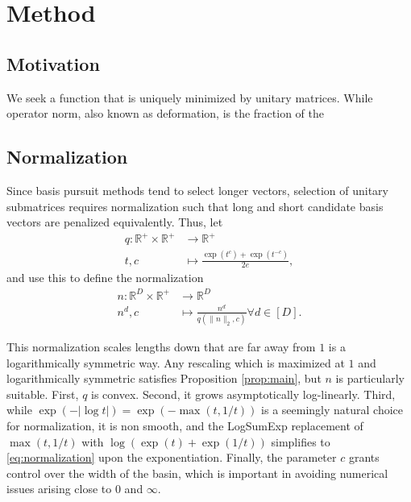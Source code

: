 \section{Method}


\subsection{Motivation}

We seek a function that is uniquely minimized by unitary matrices.
While operator norm, also known as deformation, is the fraction of the 
\subsection{Normalization}

Since basis pursuit methods tend to select longer vectors, selection of unitary submatrices requires normalization such that long and short candidate basis vectors are penalized equivalently.
Thus, let
\begin{align}
\label{eq:normalization}
q: \mathbb R^+ \times \mathbb R^+  &\to \mathbb R^+ \\
t , c &\mapsto \frac{\exp(t^c) + \exp(t^{-c})}{2e},
\end{align}
and use this to define the normalization 
\begin{align}
n: \mathbb R^D \times \mathbb R^+ &\to \mathbb R^D \\
n^d , c &\mapsto \frac{n^d}{q(\|n\|_{2},c) } \forall d \in [D].
\end{align}

This normalization scales lengths down that are far away from $1$ is a logarithmically symmetric way.
Any rescaling which is maximized at $1$ and logarithmically symmetric satisfies Proposition \ref{prop:main}, but $n$ is particularly suitable.
First, $q$ is convex.
Second, it grows asymptotically log-linearly.
Third, while $\exp(-|\log t|) = \exp(-\max (t, 1/t))$ is a seemingly natural choice for normalization, it is non smooth, and the LogSumExp replacement of $\max (t, 1/t)$ with $ \log (\exp (t ) + \exp(1/t))$ simplifies to \ref{eq:normalization} upon the exponentiation.
Finally, the parameter $c$ grants control over the width of the basin, which is important in avoiding numerical issues arising close to $0$ and $\infty$.

